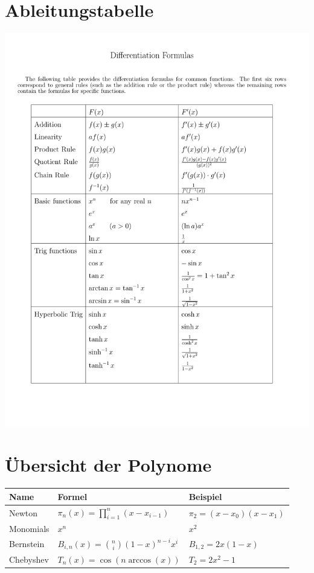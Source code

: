 \clearpage
\section{Ableitungstabelle}

\begin{center}
\includegraphics[page=1,width=14cm,trim=1.75cm 3.0cm 2.5cm 5.0cm,clip]{./files/calcrulz.pdf}
\end{center}
\hfill
\section{Übersicht der Polynome}
\begin{tabular}{l|ll}
Name & Formel & Beispiel\\
\hline
Newton    & $\pi_n(x) =\prod_{i=1}^n(x-x_{i-1})$  & $\pi_2=(x-x_0)(x-x_1)$\\
Monomials & $x^n$                       & $x^2$\\
Bernstein & $B_{i,n}(x)=\binom{n}{i}(1-x)^{n-i} x^i$   & $B_{1,2}=2x(1-x)$\\
Chebyshev & $T_n(x)=\cos(n \arccos(x))$ & $T_2=2x^2-1$ 

\end{tabular}
\newpage

